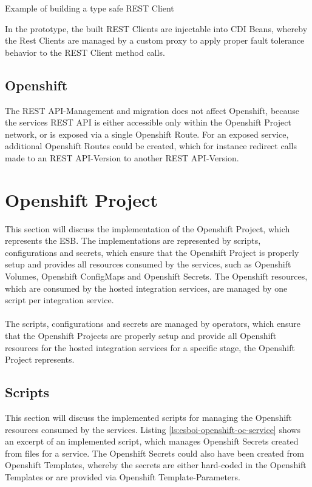 \begin{listing}[h]
	\caption{Example of building a type safe REST Client}
	\label{ls:esboi-api-client-api-builder-java}
\end{listing}

In the prototype, the built REST Clients are injectable into CDI Beans, whereby the Rest Clients are managed by a custom proxy to apply proper fault tolerance behavior to the REST Client method calls.

\subsection{Openshift}
\label{sec:esbi-api-openshift}
The REST API-Management and migration does not affect Openshift, because the services REST API is either accessible only within the Openshift Project network, or is exposed via a single Openshift Route. For an exposed service, additional Openshift Routes could be created, which for instance redirect calls made to an REST API-Version to another REST API-Version. 
\newpage

\section{Openshift Project}
\label{sec:esbi-openshift}
This section will discuss the implementation of the Openshift Project, which represents the ESB. The implementations are represented by scripts, configurations and secrets, which ensure that the Openshift Project is properly setup and provides all resources consumed by the services, such as Openshift Volumes, Openshift ConfigMaps and Openshift Secrets. The Openshift resources, which are consumed by the hosted integration services, are managed by one script per integration service. 
\\ \\
The scripts, configurations and secrets are managed by operators, which ensure that the Openshift Projects are properly setup and provide all Openshift resources for the hosted integration services for a specific stage, the Openshift Project represents.

\subsection{Scripts}
\label{sec:esbi-openshift-secrets}
This section will discuss the implemented scripts for managing the Openshift resources consumed by the services. Listing \vref{ls:esboi-openshift-oc-service} shows an excerpt of an implemented script, which manages Openshift Secrets created from files for a service. The Openshift Secrets could also have been created from Openshift Templates, whereby the secrets are either hard-coded in the Openshift Templates or are provided via Openshift Template-Parameters.

